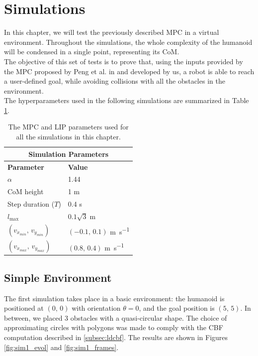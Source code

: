 \section{Simulations}\label{sec:simulations}

In this chapter, we will test the previously described MPC in a virtual environment. Throughout the simulations, the whole complexity of the humanoid will be condensed in a single point, representing its CoM.\\
The objective of this set of tests is to prove that, using the inputs provided by the MPC proposed by Peng et al. in \cite{peng_main_paper} and developed by us, a robot is able to reach a user-defined goal, while avoiding collisions with all the obstacles in the environment.\\
The hyperparameters used in the following simulations are summarized in Table \ref{table:sim_params}.

\begin{table}[h]
        \begin{tabular}{ |p{4cm}||p{4cm}| }
             \hline
             \multicolumn{2}{|c|}{Simulation Parameters} \\
             \hline
             \textbf{Parameter} & \textbf{Value}\\
             \hline
             $\alpha$   & 1.44 \\
             CoM height & 1 \si{\meter} \\
             Step duration ($T$) & 0.4 \si{\second} \\
             $l_{\max}$ & $0.1 \sqrt{3} \;\si{\meter}$ \\
             $\left( v_{x_{min}},\, v_{y_{min}} \right)$ & $\left( -0.1,\, 0.1 \right)$ \si{\meter\per\second}\\
             $\left( v_{x_{max}},\, v_{y_{max}} \right)$ & $\left( 0.8,\, 0.4 \right)$ \si{\meter\per\second}\\
             \hline
        \end{tabular}
    \centering
    \caption{The MPC and LIP parameters used for all the simulations in this chapter.}
    \label{table:sim_params}
\end{table}

\subsection{Simple Environment}\label{subsec:sim_simple_env}
The first simulation takes place in a basic environment: the humanoid is positioned at $(0,\,0)$ with orientation $\theta = 0$, and the goal position is $(5,\,5)$. In between, we placed 3 obstacles with a quasi-circular shape. The choice of approximating circles with polygons was made to comply with the CBF computation described in \ref{subsec:ldcbf}. The results are shown in Figures \ref{fig:sim1_evol} and \ref{fig:sim1_frames}.

